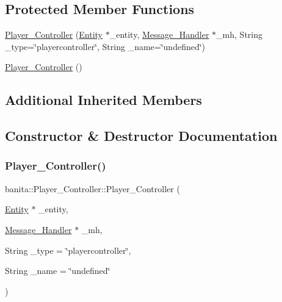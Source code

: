 \subsection*{Protected Member Functions}
\begin{DoxyCompactItemize}
\item 
\mbox{\hyperlink{classbanita_1_1_player___controller_a56ffb40adc44a04e06b0008855d9ead8}{Player\+\_\+\+Controller}} (\mbox{\hyperlink{classbanita_1_1_entity}{Entity}} $\ast$\+\_\+entity, \mbox{\hyperlink{classbanita_1_1_message___handler}{Message\+\_\+\+Handler}} $\ast$\+\_\+mh, String \+\_\+type=\char`\"{}playercontroller\char`\"{}, String \+\_\+name=\char`\"{}undefined\char`\"{})
\item 
\mbox{\hyperlink{classbanita_1_1_player___controller_acbb318ac5deac46dc7cd745689406e65}{Player\+\_\+\+Controller}} ()
\end{DoxyCompactItemize}
\subsection*{Additional Inherited Members}


\subsection{Constructor \& Destructor Documentation}
\mbox{\label{classbanita_1_1_player___controller_a56ffb40adc44a04e06b0008855d9ead8}} 
\subsubsection{\texorpdfstring{Player\_Controller()}{Player\_Controller()}\hspace{0.1cm}{\footnotesize\ttfamily [1/2]}}
{\footnotesize\ttfamily banita\+::\+Player\+\_\+\+Controller\+::\+Player\+\_\+\+Controller (\begin{DoxyParamCaption}\item[{\mbox{\hyperlink{classbanita_1_1_entity}{Entity}} $\ast$}]{\+\_\+entity,  }\item[{\mbox{\hyperlink{classbanita_1_1_message___handler}{Message\+\_\+\+Handler}} $\ast$}]{\+\_\+mh,  }\item[{String}]{\+\_\+type = {\ttfamily \char`\"{}playercontroller\char`\"{}},  }\item[{String}]{\+\_\+name = {\ttfamily \char`\"{}undefined\char`\"{}} }\end{DoxyParamCaption})\hspace{0.3cm}{\ttfamily [protected]}}

